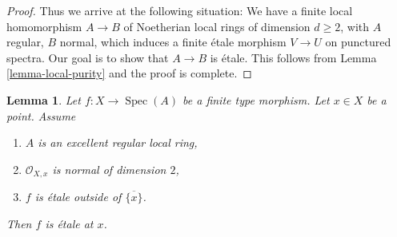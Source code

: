 \documentclass{amsart}
\theoremstyle{plain}
\newtheorem{lemma}[subsection]{Lemma}
\theoremstyle{definition}
\theoremstyle{remark}
\numberwithin{equation}{subsection}
\def\Spec{\mathop{\mathrm{Spec}}}
\begin{document}
\begin{proof}
\medskip\noindent
Thus we arrive at the following situation: We have a finite
local homomorphism $A \to B$ of Noetherian local rings
of dimension $d \geq 2$, with $A$ regular, $B$ normal, which
induces a finite \'etale morphism $V \to U$ on punctured spectra.
Our goal is to show that $A \to B$ is \'etale.
This follows from Lemma \ref{lemma-local-purity}
and the proof is complete.
\end{proof}


\begin{lemma}
\label{lemma-key-purity-ramification}
Let $f : X \to \Spec(A)$ be a finite type morphism.
Let $x \in X$ be a point. Assume
\begin{enumerate}
\item $A$ is an excellent regular local ring,
\item $\mathcal{O}_{X, x}$ is normal of dimension $2$,
\item $f$ is \'etale outside of $\overline{\{x\}}$.
\end{enumerate}
Then $f$ is \'etale at $x$.
\end{lemma}
\end{document}
